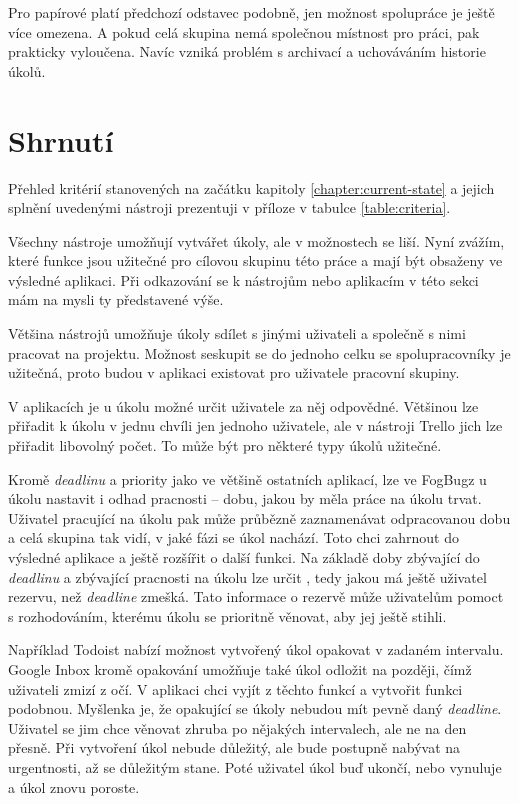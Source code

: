 \documentclass[thesis=B,czech]{FITthesis}[2012/06/26]
\begin{document}
			Pro papírové  platí předchozí odstavec podobně, jen možnost spolupráce je ještě více omezena. A pokud celá skupina nemá společnou místnost pro práci, pak prakticky vyloučena. Navíc vzniká problém s archivací a uchováváním historie úkolů.
		
	
	\section{Shrnutí}
		Přehled kritérií stanovených na začátku kapitoly \ref{chapter:current-state} a jejich splnění uvedenými nástroji prezentuji v příloze v tabulce \ref{table:criteria}.
		
		Všechny nástroje umožňují vytvářet úkoly, ale v možnostech se liší. Nyní zvážím, které funkce jsou užitečné pro cílovou skupinu této práce a mají být obsaženy ve výsledné aplikaci. Při odkazování se k nástrojům nebo aplikacím v této sekci mám na mysli ty představené výše.
		
		Většina nástrojů umožňuje úkoly sdílet s jinými uživateli a společně s nimi pracovat na projektu. Možnost seskupit se do jednoho celku se spolupracovníky je užitečná, proto budou v aplikaci existovat pro uživatele pracovní skupiny.
		
		V aplikacích je u úkolu možné určit uživatele za něj odpovědné. Většinou lze přiřadit k úkolu v jednu chvíli jen jednoho uživatele, ale v nástroji Trello jich lze přiřadit libovolný počet. To může být pro některé typy úkolů užitečné. 
		
		Kromě \textit{deadlinu} a priority jako ve většině ostatních aplikací, lze ve FogBugz u úkolu nastavit i odhad pracnosti -- dobu, jakou by měla práce na úkolu trvat. Uživatel pracující na úkolu pak může průbězně zaznamenávat odpracovanou dobu a celá skupina tak vidí, v jaké fázi se úkol nachází. Toto chci zahrnout do výsledné aplikace a ještě rozšířit o další funkci. Na základě doby zbývající do \textit{deadlinu} a zbývající pracnosti na úkolu lze určit , tedy jakou má ještě uživatel rezervu, než \textit{deadline} zmešká. Tato informace o rezervě může uživatelům pomoct s rozhodováním, kterému úkolu se prioritně věnovat, aby jej ještě stihli.
		
		Například Todoist nabízí možnost vytvořený úkol opakovat v zadaném intervalu. Google Inbox kromě opakování umožňuje také úkol odložit na později, čímž uživateli zmizí z očí. V aplikaci chci vyjít z těchto funkcí a vytvořit funkci podobnou. Myšlenka je, že opakující se úkoly nebudou mít pevně daný \textit{deadline}. Uživatel se jim chce věnovat zhruba po nějakých intervalech, ale ne na den přesně. Při vytvoření úkol nebude důležitý, ale bude postupně nabývat na urgentnosti, až se důležitým stane. Poté uživatel úkol buď ukončí, nebo vynuluje a úkol znovu poroste.
		
\end{document}
